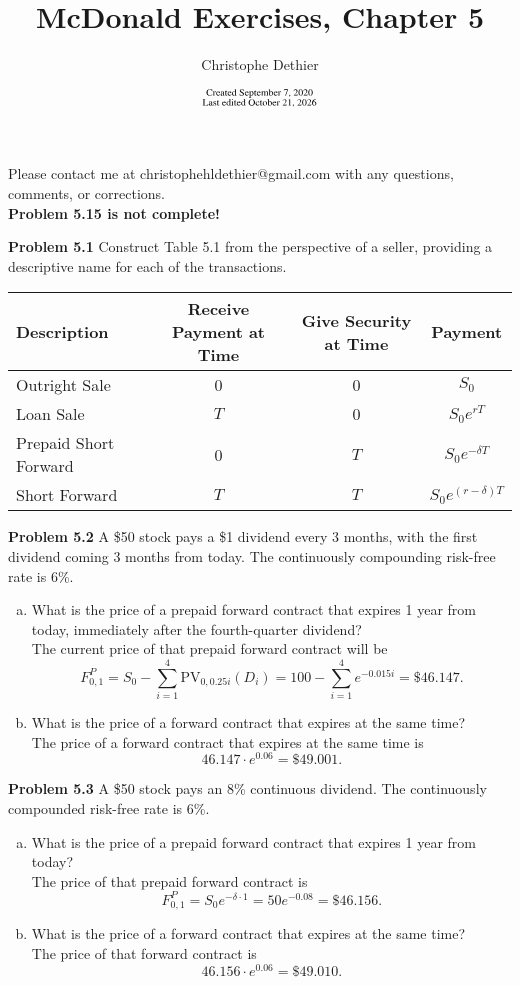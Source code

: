 \documentclass[12pt]{article}
\title{McDonald Exercises, Chapter 5}
\author{Christophe Dethier}
\date{$\substack{\text{Created September 7, 2020}\\\text{Last edited \today}}$}
\newcommand{\problem}[1]{\bigskip \noindent \textbf{Problem #1}}
\newcommand{\PV}{\text{PV}}
\theoremstyle{plain}
\begin{document}
\bigskip
\maketitle

Please contact me at christophehldethier@gmail.com with any questions, comments, or corrections.\\

\textbf{Problem 5.15 is not complete!}

\problem{5.1} Construct Table 5.1 from the perspective of a seller, providing a descriptive name for each of the transactions.\\

\begin{center}
\begin{tabular}{l||ccc}
Description & Receive Payment at Time & Give Security at Time & Payment \\ \hline \hline
Outright Sale & 0 & 0 & $S_0$\\
Loan Sale & $T$ & 0 & $S_0e^{rT}$\\
Prepaid Short Forward & 0 & $T$ & $S_0e^{-\delta T}$\\
Short Forward & $T$ & $T$ & $S_0 e^{(r-\delta)T}$
\end{tabular}
\end{center}

\problem{5.2} A \$50 stock pays a \$1 dividend every 3 months, with the first dividend coming 3 months from today. The continuously compounding risk-free rate is 6\%.
\begin{enumerate}[(a)]
\item What is the price of a prepaid forward contract that expires 1 year from today, immediately after the fourth-quarter dividend?\\

The current price of that prepaid forward contract will be
\[
F_{0,1}^{P} = S_0 - \sum_{i=1}^4 \PV_{0,0.25i}(D_i) = 100 - \sum_{i=1}^4 e^{-0.015i} =\$46.147.
\]

\item What is the price of a forward contract that expires at the same time?\\

The price of a forward contract that expires at the same time is
\[
46.147 \cdot e^{0.06} = \$49.001.
\]
\end{enumerate}

\problem{5.3} A \$50 stock pays an 8\% continuous dividend. The continuously compounded risk-free rate is 6\%.
\begin{enumerate}[(a)]
\item What is the price of a prepaid forward contract that expires 1 year from today?\\

The price of that prepaid forward contract is
\[
F_{0,1}^P = S_0 e^{-\delta \cdot 1} = 50e^{-0.08} = \$46.156.
\]

\item What is the price of a forward contract that expires at the same time?\\

The price of that forward contract is
\[
46.156 \cdot e^{0.06} = \$49.010.
\]
\end{enumerate}
\end{document}
